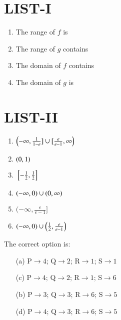 \documentclass[journal,12pt,twocolumn,article]{IEEEtran}
\theoremstyle{remark}
\begin{document}
\begin{multicols}{2}
	\section*{LIST-I}
	\begin{enumerate}[label=(\Alph*), start=16]
	\item The range of $f$ is
	\item The range of $g$ contains
	\item The domain of $f$ contains
	\item The domain of $g$ is 
\end{enumerate}
\columnbreak
	\section*{LIST-II}
\begin{enumerate}
	\item $\left(-\infty,\frac{1}{1-e}]\cup[\frac{e}{e-1},\infty\right)$
	\item $\left(0,1\right)$
	\item ${}\left[-\frac{1}{2},\frac{1}{2}\right]$
	\item $\left(-\infty,0\right)\cup\left(0,\infty\right)$
	\item $(-\infty,\frac{e}{e-1}]$
	\item $\left(-\infty,0\right)\cup\left(\frac{1}{2},\frac{e}{e-1}\right)$
\end{enumerate}
\end{multicols}
The correct option is:
\begin{multicols}{2}
	\begin{enumerate}
		\item[(a)] P$\to4$; Q$\to2$; R$\to1$; S$\to1$
		\item[(c)] P$\to4$; Q$\to2$; R$\to1$; S$\to6$
	\end{enumerate}
	\columnbreak
	\begin{enumerate}
		\item[(b)] P$\to3$; Q$\to3$; R$\to6$; S$\to5$
		\item[(d)] P$\to4$; Q$\to3$; R$\to6$; S$\to5$
	\end{enumerate}
\end{multicols}
\twocolumn
\end{document}

